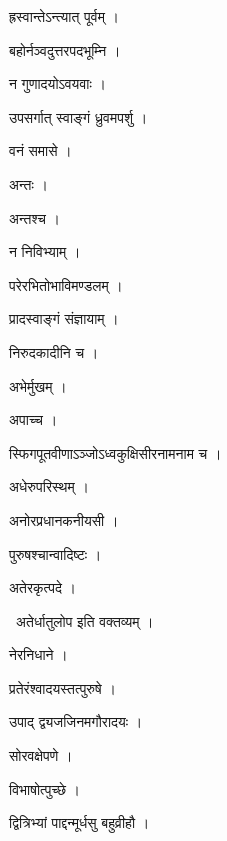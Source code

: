 \documentclass[10pt, openany, oneside]{book}
\begin{document}
\noindent ह्रस्वान्तेऽन्त्यात् पूर्वम् ।

\noindent बहोर्नञ्वदुत्तरपदभूम्नि ।

\noindent न गुणादयोऽवयवाः ।

\noindent उपसर्गात् स्वाङ्गं ध्रुवमपर्शु ।

\noindent वनं समासे ।

\noindent अन्तः ।

\noindent अन्तश्च ।

\noindent न निविभ्याम् ।

\noindent परेरभितोभाविमण्डलम् ।

\noindent प्रादस्वाङ्गं संज्ञायाम् ।

\noindent निरुदकादीनि च ।

\noindent अभेर्मुखम् ।

\noindent अपाच्च ।

\noindent स्फिगपूतवीणाऽञ्जोऽध्वकुक्षिसीरनामनाम च ।

\noindent अधेरुपरिस्थम् ।

\noindent अनोरप्रधानकनीयसी ।

\noindent पुरुषश्चान्वादिष्टः ।

\noindent अतेरकृत्पदे ।

\par\noindent\hspace{1.5em}{\vps वा॰}~{\qt अतेर्धातुलोप इति वक्तव्यम् ।}

\noindent नेरनिधाने ।

\noindent प्रतेरंश्वादयस्तत्पुरुषे ।

\noindent उपाद् द्व्यजजिनमगौरादयः ।

\noindent सोरवक्षेपणे ।

\noindent विभाषोत्पुच्छे ।

\noindent द्वित्रिभ्यां पाद्दन्मूर्धसु बहुव्रीहौ ।
\end{document}

